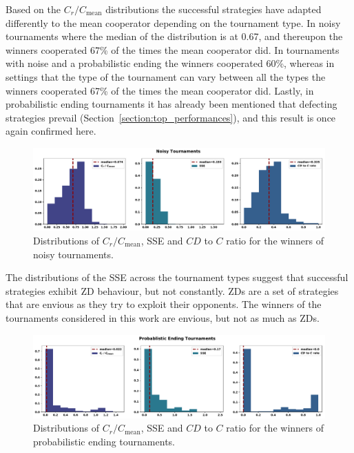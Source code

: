 \documentclass{article}
\begin{document}
Based on the \(C_r / C_{\text{mean}}\) distributions the successful strategies
have adapted differently to the mean cooperator depending on the tournament
type. In noisy tournaments where the median of the distribution is at 0.67, and
thereupon the winners cooperated 67\% of the times the mean cooperator did. In
tournaments with noise and a probabilistic ending the winners cooperated 60\%,
whereas in settings that the type of the tournament can vary between all the
types the winners cooperated 67\% of the times the mean cooperator did. Lastly,
in probabilistic ending tournaments it has already been mentioned that defecting
strategies prevail (Section~\ref{section:top_performances}), and this result is
once again confirmed here.

\begin{figure}[!htbp]
    \centering
        \centering
        \includegraphics[width=\textwidth]{../images/noisy_discussion.pdf}
        \caption{Distributions of \(C_r / C_{\text{mean}}\), SSE and \(CD\) to \(C\) ratio
        for the winners of noisy tournaments.}
        \label{fig:discussion_noisy}
\end{figure}

The distributions of the SSE across the tournament types suggest that successful
strategies exhibit ZD behaviour, but not constantly. ZDs are a set of strategies
that are envious as they try to exploit their opponents. The winners of the
tournaments considered in this work are envious, but not as much as ZDs.


\begin{figure}[!htbp]
    \centering
        \centering
        \includegraphics[width=\textwidth]{../images/probend_discussion.pdf}
        \caption{Distributions of \(C_r / C_{\text{mean}}\), SSE and \(CD\) to \(C\) ratio
        for the winners of probabilistic ending tournaments.}
        \label{fig:discussion_probend}
\end{figure}
\end{document}
